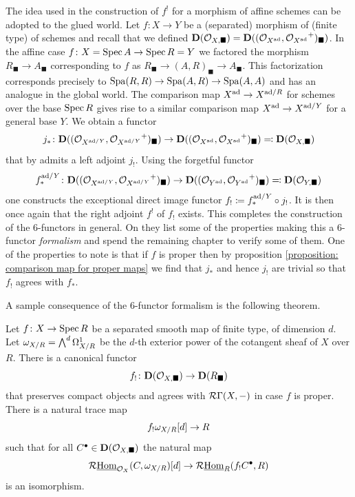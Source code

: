 \begin{construction}
	The idea used in the construction of $f^!$ for a morphism of affine schemes can be adopted to the glued world. Let $f\colon X\to Y$ be a (separated) morphism of (finite type) of schemes and recall that we defined ${{\mathbf{D}}({{\mathcal{O}}_{X,\blacksquare}})} = {{\mathbf{D}}(({{\mathcal{O}}_{X^{\mathrm{ad}}}}, {{\mathcal{O}}_{X^{\mathrm{ad}}}}^+)_\blacksquare)}$. In the affine case $f\colon X=\operatorname{Spec} A\to \operatorname{Spec} R = Y$ we factored the morphism $R_\blacksquare\to A_\blacksquare$ corresponding to $f$ as $R_\blacksquare \to (A, R)_\blacksquare \to A_\blacksquare$. This factorization corresponds precisely to $\operatorname{Spa}(R, R) \to \operatorname{Spa}(A, R) \to \operatorname{Spa}(A, A)$ and has an analogue in the global world. The comparison map $X^{\mathrm{ad}} \to X^{{\mathrm{ad}}/R}$ for schemes over the base $\operatorname{Spec} R$ gives rise to a similar comparison map $X^{\mathrm{ad}} \to X^{{\mathrm{ad}}/Y}$ for a general base $Y$. We obtain a functor
		$$j_\ast\colon {{\mathbf{D}}(({{\mathcal{O}}_{X^{{\mathrm{ad}}/Y}}}, {{\mathcal{O}}_{X^{{\mathrm{ad}}/Y}}}^+)_\blacksquare)} \to {{\mathbf{D}}(({{\mathcal{O}}_{X^{\mathrm{ad}}}}, {{\mathcal{O}}_{X^{\mathrm{ad}}}}^+)_\blacksquare)}\eqqcolon {{\mathbf{D}}({{\mathcal{O}}_{X,\blacksquare}})}$$
	that by \cite[Prop. 11.2]{condenseddotpdf} admits a left adjoint $j_!$. Using the forgetful functor
		$$f_\ast^{{\mathrm{ad}}/Y}\colon {{\mathbf{D}}(({{\mathcal{O}}_{X^{{\mathrm{ad}}/Y}}}, {{\mathcal{O}}_{X^{{\mathrm{ad}}/Y}}}^+)_\blacksquare)} \to {{\mathbf{D}}(({{\mathcal{O}}_{Y^{\mathrm{ad}}}}, {{\mathcal{O}}_{Y^{\mathrm{ad}}}}^+)_\blacksquare)}\eqqcolon {{\mathbf{D}}({{\mathcal{O}}_{Y, \blacksquare}})}$$
	one constructs the exceptional direct image functor $f_!\coloneqq f_\ast^{{\mathrm{ad}}/Y} \circ j_!$. It is then once again  that the right adjoint $f^!$ of $f_!$ exists. This completes the construction of the $6$-functors in general. On \cite[pp. 72--73]{condenseddotpdf} they list some of the properties making this a $6$-functor \emph{formalism} and spend the remaining chapter to verify some of them. One of the properties to note is that if $f$ is proper then by proposition \ref{proposition: comparison map for proper maps} we find that $j_\ast$ and hence $j_!$ are trivial so that $f_!$ agrees with $f_\ast$.
\end{construction}

A sample consequence of the $6$-functor formalism is the following theorem.
\begin{theorem}
	
	Let $f\colon X\to \operatorname{Spec} R$ be a separated smooth map of finite type, of dimension $d$. Let $\omega_{X/R}=\bigwedge\nolimits^d \Omega_{X/R}^1$ be the $d$-th exterior power of the cotangent sheaf of $X$ over $R$. There is a canonical functor
		$$f_!\colon {{\mathbf{D}}({{\mathcal{O}}_{X,\blacksquare}})} \to {{\mathbf{D}}(R_\blacksquare)}$$
	that preserves compact objects and agrees with $\mathcal{R}\Gamma(X, -)$ in case $f$ is proper. There is a natural trace map
		$$f_!\omega_{X/R}[d] \to R$$
	such that for all $C^\bullet\in {{\mathbf{D}}({{\mathcal{O}}_{X,\blacksquare}})}$ the natural map
		$$\mathcal{R}{\underline{\operatorname{Hom}}}_{{{\mathcal{O}}_{X}}}(C, \omega_{X/R})[d] \to \mathcal{R}{\underline{\operatorname{Hom}}}_R(f_!C^\bullet, R)$$
	is an isomorphism.
\end{theorem}
